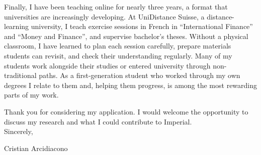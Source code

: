\documentclass[11pt]{article}
\begin{document}
Finally, I have been teaching online for nearly three years, a format that universities are increasingly developing. At UniDistance Suisse, a distance-learning university, I teach exercise sessions in French in ``International Finance'' and ``Money and Finance'', and supervise bachelor's theses. Without a physical classroom, I have learned to plan each session carefully, prepare materials students can revisit, and check their understanding regularly. Many of my students work alongside their studies or entered university through non-traditional paths. As a first-generation student who worked through my own degrees I relate to them and, helping them progress, is among the most rewarding parts of my work. %

Thank you for considering my application. I would welcome the opportunity to discuss my research and what I could contribute to Imperial. \\

Sincerely,

Cristian Arcidiacono
\end{document}
